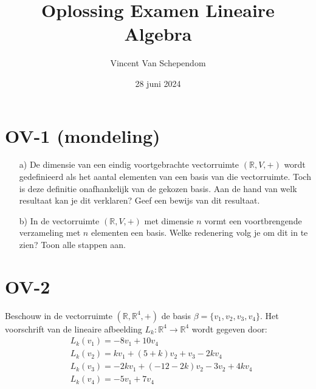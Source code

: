 \documentclass[kulak]{kulakarticle} %
\title{Oplossing Examen Lineaire Algebra}
\author{Vincent Van Schependom}
\date{28 juni 2024}
\newcommand{\R}{\mathbb{R}} %
\begin{document}
\maketitle

\section*{OV-1 (mondeling)}

\begin{itemize}
	\item[a)] De dimensie van een eindig voortgebrachte vectorruimte \((\R, V, +)\) wordt gedefinieerd als het aantal elementen van een basis van die vectorruimte. Toch is deze definitie onafhankelijk van de gekozen basis. Aan de hand van welk resultaat kan je dit verklaren? Geef een bewijs van dit resultaat.
	\item[b)] In de vectorruimte \((\R, V, +)\) met dimensie \(n\) vormt een voortbrengende verzameling met \(n\) elementen een basis. Welke redenering volg je om dit in te zien? Toon alle stappen aan.
\end{itemize}

\section*{OV-2}

Beschouw in de vectorruimte \((\R, \R^4, +)\) de basis \(\beta=\{v_1,v_2,v_3,v_4\}\). Het voorschrift van de lineaire afbeelding \(L_k:\R^4\to\R^4\) wordt gegeven door:
\begin{align*}
&L_k(v_1) = -8v_1 + 10v_4 \\
&L_k(v_2) = kv_1 + (5+k)v_2 + v_3 - 2kv_4 \\
&L_k(v_3) = -2kv_1+(-12-2k)v_2-3v_2+4kv_4 \\
&L_k(v_4) = -5v_1+7v_4
\end{align*}
\end{document}
